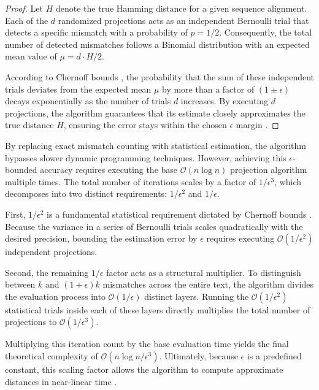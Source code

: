 \begin{proof}
Let $H$ denote the true Hamming distance for a given sequence alignment. Each of the $d$ randomized projections acts as an independent Bernoulli trial \cite{motwani1995} that detects a specific mismatch with a probability of $p = 1/2$. Consequently, the total number of detected mismatches follows a Binomial distribution with an expected mean value of $\mu = d \cdot H / 2$. 

According to Chernoff bounds \cite{motwani1995}, the probability that the sum of these independent trials deviates from the expected mean $\mu$ by more than a factor of $(1 \pm \epsilon)$ decays exponentially as the number of trials $d$ increases. By executing $d$ projections, the algorithm guarantees that its estimate closely approximates the true distance $H$, ensuring the error stays within the chosen $\epsilon$ margin \cite{indyk1998}.
\end{proof}

By replacing exact mismatch counting with statistical estimation, the algorithm bypasses slower dynamic programming techniques. However, achieving this $\epsilon$-bounded accuracy requires executing the base $\mathcal{O}(n \log n)$ projection algorithm multiple times. The total number of iterations scales by a factor of $1/\epsilon^3$, which decomposes into two distinct requirements: $1/\epsilon^2$ and $1/\epsilon$.

First, $1/\epsilon^2$ is a fundamental statistical requirement dictated by Chernoff bounds \cite{motwani1995}. Because the variance in a series of Bernoulli trials scales quadratically with the desired precision, bounding the estimation error by $\epsilon$ requires executing $\mathcal{O}(1/\epsilon^2)$ independent projections.

Second, the remaining $1/\epsilon$ factor acts as a structural multiplier. To distinguish between $k$ and $(1+\epsilon)k$ mismatches across the entire text, the algorithm divides the evaluation process into $\mathcal{O}(1/\epsilon)$ distinct layers. Running the $\mathcal{O}(1/\epsilon^2)$ statistical trials inside each of these layers directly multiplies the total number of projections to $\mathcal{O}(1/\epsilon^3)$.

Multiplying this iteration count by the base evaluation time yields the final theoretical complexity of $\mathcal{O}(n \log n / \epsilon^3)$. Ultimately, because $\epsilon$ is a predefined constant, this scaling factor allows the algorithm to compute approximate distances in near-linear time \cite{indyk1998}.

